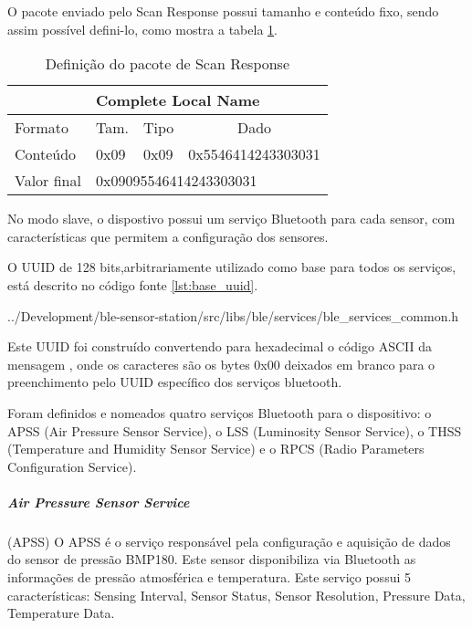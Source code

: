 O pacote enviado pelo Scan Response possui tamanho e conteúdo fixo, sendo assim
possível defini-lo, como mostra a tabela \ref{tab:scan_resp_template}.

\begin{table}[H]
\centering
\begin{tabular}{l|l|l|l|}
\cline{2-4}
                                  & \multicolumn{3}{l|}{Complete Local Name}    \\ \hline
\multicolumn{1}{|l|}{Formato}     & Tam.   & Tipo  & \multicolumn{1}{c|}{Dado}  \\ \hline
\multicolumn{1}{|l|}{Conteúdo}    & 0x09   & 0x09  & 0x5546414243303031         \\ \hline
\multicolumn{1}{|l|}{Valor final} & \multicolumn{3}{l|}{0x09095546414243303031} \\ \hline
\end{tabular}
\caption{Definição do pacote de Scan Response}
\label{tab:scan_resp_template}
\end{table}

No modo slave, o dispostivo possui um serviço Bluetooth para cada sensor, com
características que permitem a configuração dos sensores.

O UUID de 128 bits,arbitrariamente utilizado como base para
todos os serviços, está descrito no código fonte \ref{lst:base_uuid}.


{../Development/ble-sensor-station/src/libs/ble/services/ble_services_common.h}

Este UUID foi construído convertendo para hexadecimal o código ASCII da mensagem
, onde os caracteres \dblquote{\_\_} são os bytes
0x00 deixados em branco para o preenchimento pelo UUID específico dos serviços
bluetooth.

Foram definidos e nomeados quatro serviços Bluetooth para o dispositivo: o APSS
(Air Pressure Sensor Service), o LSS (Luminosity Sensor Service), o THSS
(Temperature and Humidity Sensor Service) e o RPCS (Radio Parameters
Configuration Service).

\newpage
\subparagraph{Air Pressure Sensor Service}(APSS) 
\newline
O APSS é o serviço responsável pela configuração e aquisição de dados do sensor
de pressão BMP180. Este sensor disponibiliza via Bluetooth as informações de
pressão atmosférica e temperatura. Este serviço possui 5 características:
Sensing Interval, Sensor Status, Sensor Resolution, Pressure Data, Temperature
Data.

